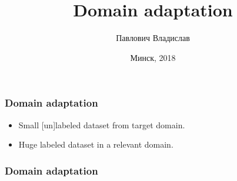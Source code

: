 \documentclass[14pt,aspectratio=169]{beamer}
\title{Domain adaptation}
\author{\small{Павлович Владислав}
\vspace{20pt}%
}
\date{\small{Минск, 2018}}
\begin{document}
\maketitle

\begin{frame}
\frametitle{Domain adaptation}
\begin{itemize}
\item Small [un]labeled dataset from target domain.
\item Huge labeled dataset in a relevant domain.
\end{itemize}
\end{frame}

\begin{frame}
\frametitle{Domain adaptation}
\end{frame}

\begin{frame}
\begin{figure}
\centering
{}
\end{figure}
\end{frame}
\end{document}
